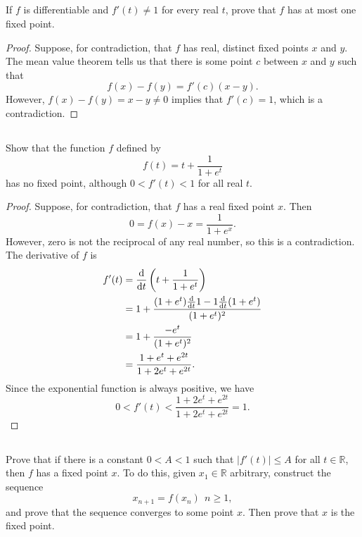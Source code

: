 \documentclass[12pt]{article}
\newenvironment{problem}
    {\begin{lrbox}{\mybox}\begin{minipage}{0.98\textwidth}}
    {\end{minipage}\end{lrbox}\begin{center}\framebox[\textwidth]{\usebox{\mybox}}\end{center}}
\theoremstyle{definition}
\begin{document}
\subsection{}
\begin{problem}
    If $f$ is differentiable and $f'(t)\ne 1$ for every real $t$, prove that $f$ has at most one fixed point.
\end{problem}

\begin{proof}
    Suppose, for contradiction, that $f$ has real, distinct fixed points $x$ and $y$. The mean value theorem tells us that there is some point $c$ between $x$ and $y$ such that
    \[
        f(x) - f(y) = f'(c)(x - y).
    \]
    However, $f(x) - f(y) = x - y \ne 0$ implies that $f'(c) = 1$, which is a contradiction.
    
\end{proof}

\subsection{}
\begin{problem}
    Show that the function $f$ defined by 
    \[
    f(t) = t + \frac{1}{1+e^t}
    \]
    has no fixed point, although $0 < f'(t) < 1$ for all real $t$.
\end{problem}

\begin{proof}
    Suppose, for contradiction, that $f$ has a real fixed point $x$. Then
    \[
        0 = f(x) - x = \frac{1}{1 + e^x}.
    \]
    However, zero is not the reciprocal of any real number, so this is a contradiction. The derivative of $f$ is
    \begin{align*}
        f'(t)
            &= \dv{t}\left(t + \frac{1}{1+e^t}\right) \\
            &= 1 + \frac{(1 + e^t)\dv{t}1 - 1\dv{t}(1 + e^t)}{(1 + e^t)^2} \\
            &= 1 + \frac{-e^t}{(1 + e^t)^2} \\
            &= \frac{1 + e^t + e^{2t}}{1 + 2e^t + e^{2t}}.
    \end{align*}
    Since the exponential function is always positive, we have
    \[
        0 < f'(t) < \frac{1 + 2e^t + e^{2t}}{1 + 2e^t + e^{2t}} = 1.
    \]

\end{proof}

\subsection{}
\begin{problem}
    Prove that if there is a constant $0<A<1$ such that $|f'(t)|\le A$ for all $t \in \mathbb{R}$, then $f$ has a fixed point $x$. To do this, given $x_1 \in\mathbb{R}$ arbitrary, construct the sequence
    \[
    x_{n+1} = f(x_n)\ \ n \ge 1,
    \]
    and prove that the sequence converges to some point $x$. Then prove that $x$ is the fixed point.
\end{problem}
\end{document}
